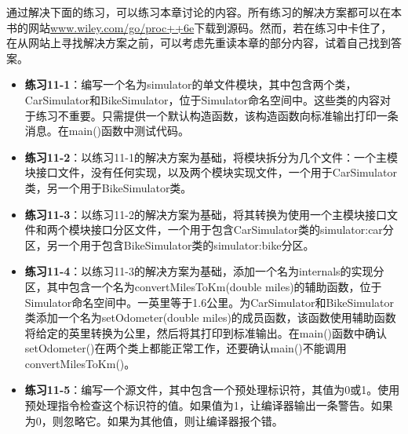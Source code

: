通过解决下面的练习，可以练习本章讨论的内容。所有练习的解决方案都可以在本书的网站\url{www.wiley.com/go/proc++6e}下载到源码。然而，若在练习中卡住了，在从网站上寻找解决方案之前，可以考虑先重读本章的部分内容，试着自己找到答案。

\begin{itemize}
\item
\textbf{练习11-1}：编写一个名为simulator的单文件模块，其中包含两个类，CarSimulator和BikeSimulator，位于Simulator命名空间中。这些类的内容对于练习不重要。只需提供一个默认构造函数，该构造函数向标准输出打印一条消息。在main()函数中测试代码。

\item
\textbf{练习11-2}：以练习11-1的解决方案为基础，将模块拆分为几个文件：一个主模块接口文件，没有任何实现，以及两个模块实现文件，一个用于CarSimulator类，另一个用于BikeSimulator类。

\item
\textbf{练习11-3}：以练习11-2的解决方案为基础，将其转换为使用一个主模块接口文件和两个模块接口分区文件，一个用于包含CarSimulator类的simulator:car分区，另一个用于包含BikeSimulator类的simulator:bike分区。

\item
\textbf{练习11-4}：以练习11-3的解决方案为基础，添加一个名为internals的实现分区，其中包含一个名为convertMilesToKm(double miles)的辅助函数，位于Simulator命名空间中。一英里等于1.6公里。为CarSimulator和BikeSimulator类添加一个名为setOdometer(double miles)的成员函数，该函数使用辅助函数将给定的英里转换为公里，然后将其打印到标准输出。在main()函数中确认setOdometer()在两个类上都能正常工作，还要确认main()不能调用convertMilesToKm()。

\item
\textbf{练习11-5}：编写一个源文件，其中包含一个预处理标识符，其值为0或1。使用预处理指令检查这个标识符的值。如果值为1，让编译器输出一条警告。如果为0，则忽略它。如果为其他值，则让编译器报个错。
\end{itemize}













